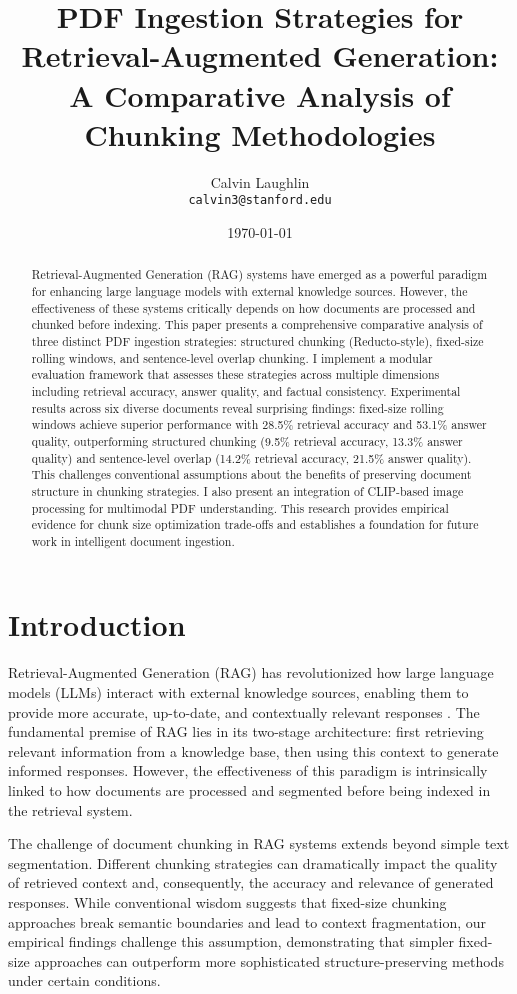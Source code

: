 \documentclass[11pt,a4paper]{article}
\title{\textbf{ PDF Ingestion Strategies for Retrieval-Augmented Generation: A Comparative Analysis of Chunking Methodologies}}
\author{Calvin Laughlin\\
\texttt{calvin3@stanford.edu}}
\date{\today}
\begin{document}
\maketitle

\begin{abstract}
Retrieval-Augmented Generation (RAG) systems have emerged as a powerful paradigm for enhancing large language models with external knowledge sources. However, the effectiveness of these systems critically depends on how documents are processed and chunked before indexing. This paper presents a comprehensive comparative analysis of three distinct PDF ingestion strategies: structured chunking (Reducto-style), fixed-size rolling windows, and sentence-level overlap chunking. I implement a modular evaluation framework that assesses these strategies across multiple dimensions including retrieval accuracy, answer quality, and factual consistency. Experimental results across six diverse documents reveal surprising findings: fixed-size rolling windows achieve superior performance with 28.5\% retrieval accuracy and 53.1\% answer quality, outperforming structured chunking (9.5\% retrieval accuracy, 13.3\% answer quality) and sentence-level overlap (14.2\% retrieval accuracy, 21.5\% answer quality). This challenges conventional assumptions about the benefits of preserving document structure in chunking strategies. I also present an integration of CLIP-based image processing for multimodal PDF understanding. This research provides empirical evidence for chunk size optimization trade-offs and establishes a foundation for future work in intelligent document ingestion.
\end{abstract}

\section{Introduction}

Retrieval-Augmented Generation (RAG) has revolutionized how large language models (LLMs) interact with external knowledge sources, enabling them to provide more accurate, up-to-date, and contextually relevant responses \citep{lewis2020retrieval}. The fundamental premise of RAG lies in its two-stage architecture: first retrieving relevant information from a knowledge base, then using this context to generate informed responses. However, the effectiveness of this paradigm is intrinsically linked to how documents are processed and segmented before being indexed in the retrieval system.

The challenge of document chunking in RAG systems extends beyond simple text segmentation. Different chunking strategies can dramatically impact the quality of retrieved context and, consequently, the accuracy and relevance of generated responses. While conventional wisdom suggests that fixed-size chunking approaches break semantic boundaries and lead to context fragmentation, our empirical findings challenge this assumption, demonstrating that simpler fixed-size approaches can outperform more sophisticated structure-preserving methods under certain conditions.
\end{document}
